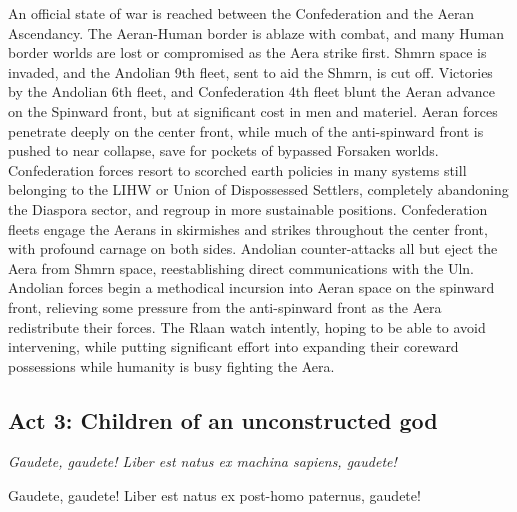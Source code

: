An official state of war is reached between the Confederation and the
Aeran Ascendancy. The Aeran-Human border is ablaze with combat, and
many Human border worlds are lost or compromised as the Aera strike
first. Shmrn space is invaded, and the Andolian 9th fleet, sent to aid
the Shmrn, is cut off. Victories by the Andolian 6th fleet, and
Confederation 4th fleet blunt the Aeran advance on the Spinward front,
but at significant cost in men and materiel. Aeran forces penetrate
deeply on the center front, while much of the anti-spinward front is
pushed to near collapse, save for pockets of bypassed Forsaken
worlds. Confederation forces resort to scorched earth policies in many
systems still belonging to the LIHW or Union of Dispossessed Settlers,
completely abandoning the Diaspora sector, and regroup in more
sustainable positions. Confederation fleets engage the Aerans in
skirmishes and strikes throughout the center front, with profound
carnage on both sides. Andolian counter-attacks all but eject the Aera
from Shmrn space, reestablishing direct communications with the
Uln. Andolian forces begin a methodical incursion into Aeran space on
the spinward front, relieving some pressure from the anti-spinward
front as the Aera redistribute their forces. The Rlaan watch intently,
hoping to be able to avoid intervening, while putting significant
effort into expanding their coreward possessions while humanity is busy
fighting the Aera.

\subsection{Act 3:  Children of an unconstructed god}

\begin{center}
{\it Gaudete, gaudete! Liber est natus ex machina sapiens, gaudete!

Gaudete, gaudete! Liber est natus ex post-homo paternus, gaudete!}
\end{center}

